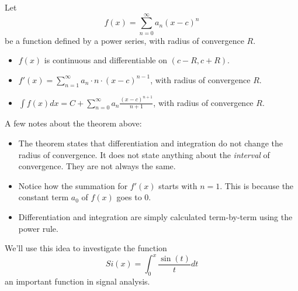 \documentclass{ximera}
\begin{document}
\begin{theorem}
  Let
  \[
  f(x) = \sum_{n=0}^\infty a_n(x-c)^n
  \]
  be a function defined by a power series, with radius of convergence $R$.
  \begin{itemize}
  \item $f(x)$ is continuous and differentiable on $(c-R,c+R)$.
  \item	$f'(x) = \sum_{n=1}^\infty a_n\cdot n\cdot (x-c)^{n-1}$, with radius of convergence $R$.
  \item	$\int f(x) dx = C+\sum_{n=0}^\infty a_n\frac{(x-c)^{n+1}}{n+1}$, with radius of convergence $R$.
  \end{itemize}
\end{theorem}
A few notes about the theorem above:
\begin{itemize}
\item The theorem states that differentiation and integration do not
  change the radius of convergence. It does not state anything about
  the \textit{interval} of convergence. They are not always the same.
\item Notice how the summation for $f'(x)$ starts with $n=1$. This is
  because the constant term $a_0$ of $f(x)$ goes to $0$.
\item Differentiation and integration are simply calculated
  term-by-term using the power rule.
\end{itemize}

We'll use this idea to investigate the function 
\[
Si(x) = \int_0^x \frac{\sin(t)}{t} dt
\]
an important function in signal analysis.
\end{document}

